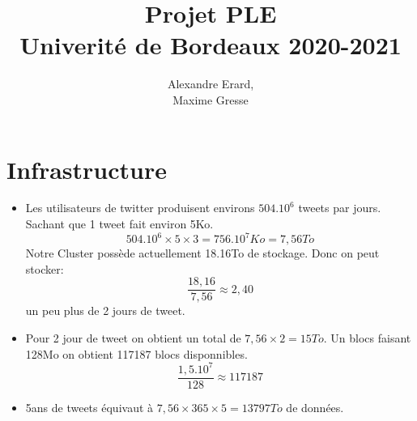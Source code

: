 \documentclass[a4paper]{article}
\title{Projet PLE \\ Univerité de Bordeaux 2020-2021}
\author{
    Alexandre Erard, \\
    Maxime Gresse
    }
\begin{document}
\maketitle
\section{Infrastructure}
\begin{itemize}
    \item Les utilisateurs de twitter produisent environs $504.10^6$ tweets par jours. Sachant que 1 tweet fait environ 5Ko.
    \[ 504.10^6 \times 5 \times 3 = 756.10^7 Ko = 7,56 To\]
    Notre Cluster possède actuellement 18.16To de stockage. Donc on peut stocker:
    \[  \frac{18,16}{7,56} \approx 2,40\]
    un peu plus de 2 jours de tweet.
    
    \item Pour 2 jour de tweet on obtient un total de $7,56 \times 2 = 15To$. Un blocs faisant 128Mo on obtient 117187 blocs disponnibles.
    \[ \frac{1,5.10^7}{128} \approx 117187\]

    \item 5ans de tweets équivaut à  $7,56 \times 365 \times 5 = 13797To $ de données.
    
\end{itemize}
\end{document}
